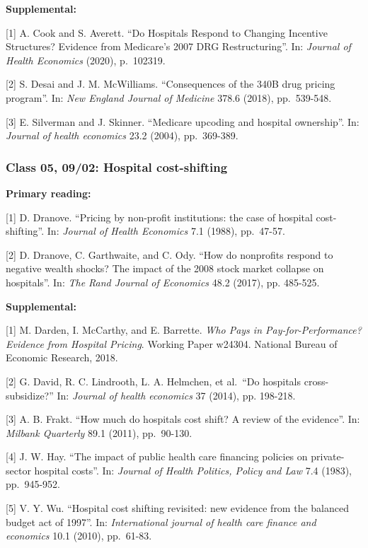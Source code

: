 \documentclass[11pt,]{article}
\begin{document}
\textbf{Supplemental:}

{[}1{]} A. Cook and S. Averett. ``Do Hospitals Respond to Changing
Incentive Structures? Evidence from Medicare's 2007 DRG Restructuring''.
In: \emph{Journal of Health Economics} (2020), p.~102319.

{[}2{]} S. Desai and J. M. McWilliams. ``Consequences of the 340B drug
pricing program''. In: \emph{New England Journal of Medicine} 378.6
(2018), pp.~539-548.

{[}3{]} E. Silverman and J. Skinner. ``Medicare upcoding and hospital
ownership''. In: \emph{Journal of health economics} 23.2 (2004),
pp.~369-389.

\hypertarget{class-05-0902-hospital-cost-shifting}{%
\subsubsection{Class 05, 09/02: Hospital
cost-shifting}\label{class-05-0902-hospital-cost-shifting}}

\textbf{Primary reading:}

{[}1{]} D. Dranove. ``Pricing by non-profit institutions: the case of
hospital cost-shifting''. In: \emph{Journal of Health Economics} 7.1
(1988), pp.~47-57.

{[}2{]} D. Dranove, C. Garthwaite, and C. Ody. ``How do nonprofits
respond to negative wealth shocks? The impact of the 2008 stock market
collapse on hospitals''. In: \emph{The Rand Journal of Economics} 48.2
(2017), pp. 485-525.

\textbf{Supplemental:}

{[}1{]} M. Darden, I. McCarthy, and E. Barrette. \emph{Who Pays in
Pay-for-Performance? Evidence from Hospital Pricing}. Working Paper
w24304. National Bureau of Economic Research, 2018.

{[}2{]} G. David, R. C. Lindrooth, L. A. Helmchen, et al.~``Do hospitals
cross-subsidize?'' In: \emph{Journal of health economics} 37 (2014), pp.
198-218.

{[}3{]} A. B. Frakt. ``How much do hospitals cost shift? A review of the
evidence''. In: \emph{Milbank Quarterly} 89.1 (2011), pp.~90-130.

{[}4{]} J. W. Hay. ``The impact of public health care financing policies
on private-sector hospital costs''. In: \emph{Journal of Health
Politics, Policy and Law} 7.4 (1983), pp.~945-952.

{[}5{]} V. Y. Wu. ``Hospital cost shifting revisited: new evidence from
the balanced budget act of 1997''. In: \emph{International journal of
health care finance and economics} 10.1 (2010), pp.~61-83.
\end{document}
